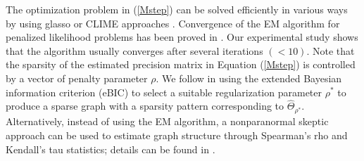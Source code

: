 The optimization problem in (\ref{Mstep}) can be solved efficiently in various ways by using glasso or CLIME approaches \citep{friedman2008sparse, hsieh2011sparse}. Convergence of the EM algorithm for penalized likelihood problems has been proved in \citet{green1990use}. Our experimental study shows that the algorithm usually converges after several iterations $(< 10)$. Note that the sparsity of the estimated precision matrix in Equation (\ref{Mstep}) is controlled by a vector of penalty parameter $\rho$. We follow \cite{foygel2010extended} in using the extended Bayesian information criterion (eBIC) to select a suitable regularization parameter $\rho^*$ to produce a sparse graph with a sparsity pattern corresponding to $\widehat{\Theta}_{\rho^*}$. Alternatively, instead of using the EM algorithm, a nonparanormal skeptic approach can be used to estimate graph structure through Spearman's rho and Kendall's tau statistics; details can be found in \citet{liu2012high}. 




